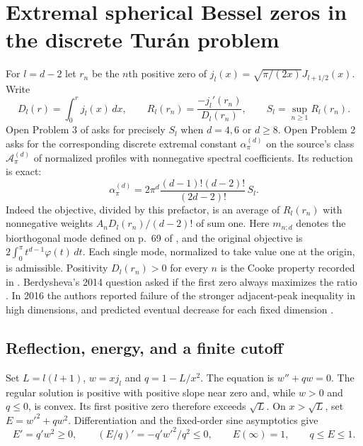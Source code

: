 \documentclass[11pt,a4paper]{article}
\theoremstyle{remark}\newtheorem{remark}[theorem]{Remark}
\numberwithin{equation}{section}
\begin{document}
\section{Extremal spherical Bessel zeros in the discrete Tur\'an problem}
\label{sec:bb-ratios}
For $l=d-2$ let $r_n$ be the $n$th positive zero of $j_l(x)=\sqrt{\pi/(2x)}J_{l+1/2}(x)$. Write
\[
 D_l(r)=\int_0^r j_l(x)\,dx,\qquad
 R_l(r_n)=\frac{-j_l'(r_n)}{D_l(r_n)},\qquad
 S_l=\sup_{n\ge1}R_l(r_n).
\]
Open Problem 3 of \cite[p.~71]{BB16} asks for precisely $S_l$ when $d=4,6$
or $d\ge8$. Open Problem 2 asks for the corresponding discrete extremal
constant $\alpha_\pi^{(d)}$ on the source's class $\mathcal A_\pi^{(d)}$ of
normalized profiles with nonnegative spectral coefficients. Its reduction
\cite[eqs.~(7)--(9)]{BB16} is exact:
\begin{equation}
 \alpha_\pi^{(d)}=
 2\pi^d\frac{(d-1)!(d-2)!}{(2d-2)!}\,S_l .
 \label{eq:bb-original}
\end{equation}
Indeed the objective, divided by this prefactor, is an average of $R_l(r_n)$
with nonnegative weights $A_nD_l(r_n)/(d-2)!$ of sum one.
Here $m_{n;d}$ denotes the biorthogonal mode defined on p.~69 of \cite{BB16}, and the original objective is $2\int_0^\pi t^{d-1}\varphi(t)\,dt$. Each single mode, normalized to take value one at the origin, is admissible. Positivity $D_l(r_n)>0$ for every $n$
is the Cooke property recorded in \cite{BB14N}.
Berdysheva's 2014 question asked if the first zero always maximizes the
ratio \cite{BB14N,BB14}. In 2016 the authors reported failure of the
stronger adjacent-peak inequality in high dimensions, and predicted eventual
decrease for each fixed dimension \cite[after Theorem~4]{BB16}.

\subsection{Reflection, energy, and a finite cutoff}
Set $L=l(l+1)$, $w=xj_l$ and $q=1-L/x^2$. The equation is
$w''+qw=0$. The regular solution is positive with positive slope near
zero and, while $w>0$ and $q\le0$, is convex. Its first positive zero
therefore exceeds $\sqrt L$. On $x>\sqrt L$, set $E=w'^2+qw^2$.
Differentiation and the fixed-order sine asymptotics give
\begin{equation}
 E'=q'w^2\ge0,\qquad (E/q)'=-q'w'^2/q^2\le0,\qquad
 E(\infty)=1,\qquad q\le E\le1.
 \label{eq:bb-energy}
\end{equation}
\end{document}
